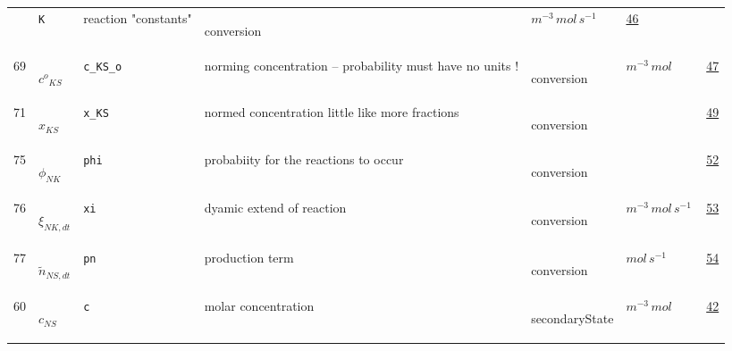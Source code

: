 \begin{longtable}{|p{1cm}|p{3cm}|p{5cm}|p{7.5cm}|p{3.0cm}|p{3cm}|p{1cm}|}
             & \verb|K|
             & reaction "constants"
             & \begin{lay}conversion \end{lay}
             & $ m^{-3} \,mol \,s^{-1} \, $
             & \hyperlink{"e:46"}{ 46 }
                 \\
    69
             & \hypertarget{"v:69"}{ $ {c^{o}}_{{K S}} $}
             & \verb|c_KS_o|
             & norming concentration -- probability must have no units !
             & \begin{lay}conversion \end{lay}
             & $ m^{-3} \,mol \, $
             & \hyperlink{"e:47"}{ 47 }
                 \\
    71
             & \hypertarget{"v:71"}{ $ {x}_{{K S}} $}
             & \verb|x_KS|
             & normed concentration little like more fractions
             & \begin{lay}conversion \end{lay}
             & $  $
             & \hyperlink{"e:49"}{ 49 }
                 \\
    75
             & \hypertarget{"v:75"}{ $ {\phi}_{{N K}} $}
             & \verb|phi|
             & probabiity for the reactions to occur
             & \begin{lay}conversion \end{lay}
             & $  $
             & \hyperlink{"e:52"}{ 52 }
                 \\
    76
             & \hypertarget{"v:76"}{ $ {\xi}_{{N K}, dt} $}
             & \verb|xi|
             & dyamic extend of reaction
             & \begin{lay}conversion \end{lay}
             & $ m^{-3} \,mol \,s^{-1} \, $
             & \hyperlink{"e:53"}{ 53 }
                 \\
    77
             & \hypertarget{"v:77"}{ $ {\tilde{n}}_{{N S}, dt} $}
             & \verb|pn|
             & production term
             & \begin{lay}conversion \end{lay}
             & $ mol \,s^{-1} \, $
             & \hyperlink{"e:54"}{ 54 }
                 \\
    60
             & \hypertarget{"v:60"}{ $ {c}_{{N S}} $}
             & \verb|c|
             & molar concentration
             & \begin{lay}secondaryState \end{lay}
             & $ m^{-3} \,mol \, $
             & \hyperlink{"e:42"}{ 42 }
                 \\
    \end{longtable}